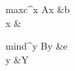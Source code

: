 \documentclass{article}
\begin{document}
\begin{lpalign}{max}{c^\top x}
  Ax &\le b \\
  x  &
\end{lpalign}

\begin{lpalign}[st=subject\ to]{min}{d^\top y}
  By &\ge e \\
  y  &\in Y
\end{lpalign}
\end{document}
